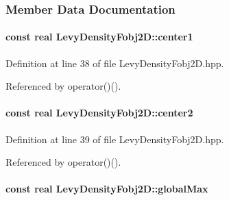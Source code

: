 \subsubsection{\-Member \-Data \-Documentation}
\hypertarget{classLevyDensityFobj2D_a4804ea4e7f8002b894f2f615e2068e5c}{
\paragraph[{center1}]{\setlength{\rightskip}{0pt plus 5cm}const real {\bf \-Levy\-Density\-Fobj2\-D\-::center1}}}\label{classLevyDensityFobj2D_a4804ea4e7f8002b894f2f615e2068e5c}


\-Definition at line 38 of file \-Levy\-Density\-Fobj2\-D.\-hpp.



\-Referenced by operator()().

\hypertarget{classLevyDensityFobj2D_a5a0110c10724caa7e1956618946fb674}{
\paragraph[{center2}]{\setlength{\rightskip}{0pt plus 5cm}const real {\bf \-Levy\-Density\-Fobj2\-D\-::center2}}}\label{classLevyDensityFobj2D_a5a0110c10724caa7e1956618946fb674}


\-Definition at line 39 of file \-Levy\-Density\-Fobj2\-D.\-hpp.



\-Referenced by operator()().

\hypertarget{classLevyDensityFobj2D_a6c87c8726a65d75e1bcb0d011e0f837e}{
\paragraph[{global\-Max}]{\setlength{\rightskip}{0pt plus 5cm}const real {\bf \-Levy\-Density\-Fobj2\-D\-::global\-Max}}}\label{classLevyDensityFobj2D_a6c87c8726a65d75e1bcb0d011e0f837e}


